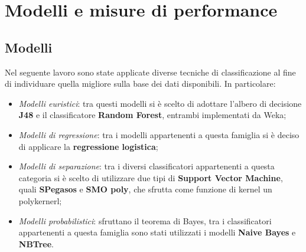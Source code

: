 \documentclass[fleqn,10pt]{SelfArx}
\begin{document}
\section{Modelli e misure di performance}
\subsection{Modelli}
Nel seguente lavoro sono state applicate diverse tecniche di classificazione al fine di individuare quella migliore sulla base dei dati disponibili. In particolare:
\begin{itemize}
    \item \textit{Modelli euristici}: tra questi modelli si è scelto di adottare l'albero di decisione \textbf{J48} e il classificatore \textbf{Random Forest}, entrambi implementati da Weka;
    \item \textit{Modelli di regressione}: tra i modelli appartenenti a questa famiglia si è deciso di applicare la \textbf{regressione logistica};
    \item \textit{Modelli di separazione}: tra i diversi classificatori appartenenti a questa categoria si è scelto di utilizzare due tipi di \textbf{Support Vector Machine}, quali \textbf{SPegasos} e \textbf{SMO poly}, che sfrutta come funzione di kernel un polykernerl;
    \item \textit{Modelli probabilistici}: sfruttano il teorema di Bayes, tra i classificatori appartenenti a questa famiglia sono stati utilizzati i modelli \textbf{Naive Bayes} e \textbf{NBTree}.
\end{itemize}
\end{document}
